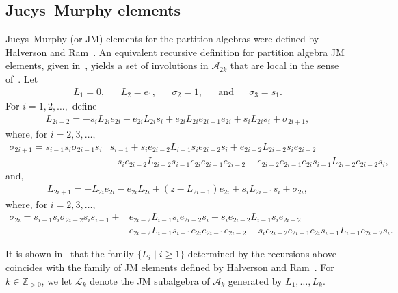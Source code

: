 \documentclass[11pt,a4paper,reqno,svgnames]{amsart}
\theoremstyle{plain}
\theoremstyle{definition}
\numberwithin{equation}{section}
\begin{document}
\subsection{Jucys--Murphy elements}\label{j-m-s}
Jucys--Murphy (or JM) elements for the partition algebras were defined by Halverson and Ram~\cite[Sect.~3]{MR2143201}. An equivalent recursive definition for partition algebra JM elements, given in~\cite[Sect.~3]{MR3035512}, yields a set of involutions in $\mathcal{A}_{2k}$ that are local in the sense of~\cite{MR1109059}. 
Let 
\begin{align*}
L_1=0,&& L_2=e_1,&& \sigma_{2}=1,&&\text{and}&&\sigma_3=s_1.
\end{align*}
For $i=1,2,\dots,$ define 
\begin{align}\label{jm-i-1}
L_{2i+2}=-s_iL_{2i}e_{2i}-e_{2i}L_{2i}s_i+ e_{2i}L_{2i}e_{2i+1}e_{2i} +s_{i}L_{2i}s_{i}+\sigma_{2i+1},
\end{align}
where, for $i=2,3,\dots,$
\begin{equation}
\begin{split}\label{sigma-i-1}
\sigma_{2i+1}=s_{i-1}s_i\sigma_{2i-1}s_i&s_{i-1} +s_ie_{2i-2}L_{i-1}s_ie_{2i-2}s_i+e_{2i-2}L_{2i-2}s_ie_{2i-2}\\
&-s_ie_{2i-2}L_{2i-2}s_{i-1}e_{2i}e_{2i-1}e_{2i-2}-e_{2i-2}e_{2i-1}e_{2i}s_{i-1}L_{2i-2}e_{2i-2}s_i,
\end{split}
\end{equation}
and,
\begin{align}\label{jm-i-2}
L_{2i+1}=-L_{2i}e_{2i}-e_{2i}L_{2i}+(z-L_{2i-1})e_{2i}+s_iL_{2i-1}s_i+\sigma_{2i},
\end{align}
where, for $i=2,3,\dots,$
\begin{equation}
\begin{split}\label{sigma-i-2}
\sigma_{2i}=s_{i-1}s_i\sigma_{2i-2}s_is_{i-1}+&e_{2i-2}L_{i-1}s_ie_{2i-2}s_i+s_ie_{2i-2}L_{i-1}s_ie_{2i-2}\\
-&e_{2i-2}L_{i-1}s_{i-1}e_{2i}e_{2i-1}e_{2i-2}-s_ie_{2i-2}e_{2i-1}e_{2i}s_{i-1}L_{i-1}e_{2i-2}s_i.
\end{split}
\end{equation}

It is shown in~\cite[Theorem~5.5]{MR3035512} that the family $\{L_i\mid i{\geqslant}1\}$ determined by the recursions above coincides with the family of JM elements defined by Halverson and Ram~\cite{MR2143201}. For $k\in\mathbb{Z}_{>0}$, we let $\mathscr{L}_k$ denote the JM subalgebra of $\mathcal{A}_k$ generated by $L_1,\ldots,L_k$. 
\end{document}
